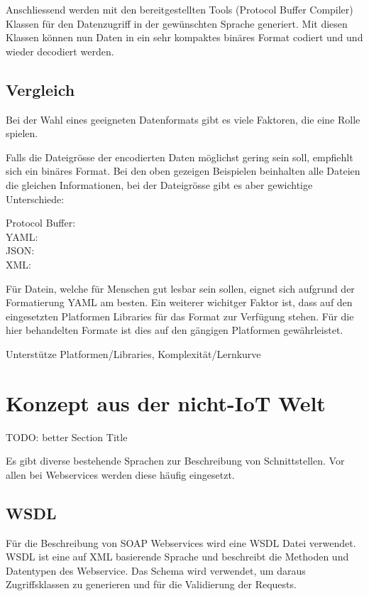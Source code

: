 Anschliessend werden mit den bereitgestellten Tools (Protocol Buffer Compiler) Klassen für den Datenzugriff in der gewünschten Sprache generiert. Mit diesen Klassen können nun Daten in ein sehr kompaktes binäres Format codiert und und wieder decodiert werden.

\subsection{Vergleich}

Bei der Wahl eines geeigneten Datenformats gibt es viele Faktoren, die eine Rolle spielen.

Falls die Dateigrösse der encodierten Daten möglichst gering sein soll, empfiehlt sich ein binäres Format. Bei den oben gezeigen Beispielen beinhalten alle Dateien die gleichen Informationen, bei der Dateigrösse gibt es aber gewichtige Unterschiede:

Protocol Buffer:   \\
YAML:              \\
JSON:              \\
XML:              

Für Datein, welche für Menschen gut lesbar sein sollen, eignet sich aufgrund der Formatierung YAML am besten. Ein weiterer wichitger Faktor ist, dass auf den eingesetzten Platformen Libraries für das Format zur Verfügung stehen. Für die hier behandelten Formate ist dies auf den gängigen Platformen gewährleistet.

Unterstütze Platformen/Libraries, Komplexität/Lernkurve




\section{Konzept aus der nicht-IoT Welt}
TODO: better Section Title

Es gibt diverse bestehende Sprachen zur Beschreibung von Schnittstellen. Vor allen bei Webservices werden diese häufig eingesetzt.

\subsection{WSDL}
Für die Beschreibung von SOAP Webservices wird eine WSDL Datei verwendet. WSDL ist eine auf XML basierende Sprache und beschreibt die Methoden und Datentypen des Webservice. Das Schema wird verwendet, um daraus Zugriffsklassen zu generieren und für die Validierung der Requests.

